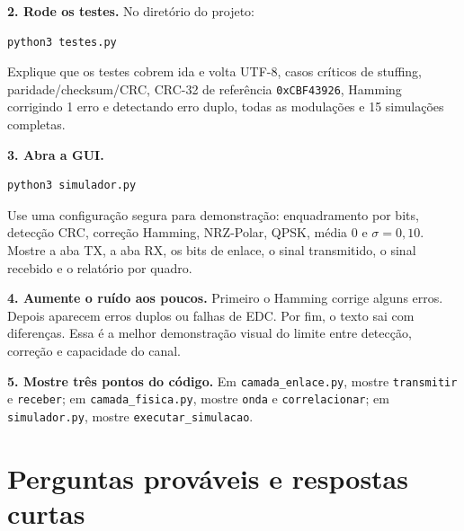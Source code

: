 \documentclass[10pt,a4paper]{article}
\newcommand{\arquivo}[1]{\texttt{#1}}
\newcommand{\codigo}[1]{\texttt{#1}}
\begin{document}
\textbf{2. Rode os testes.} No diretório do projeto:
\begin{verbatim}
python3 testes.py
\end{verbatim}
Explique que os testes cobrem ida e volta UTF-8, casos críticos de stuffing, paridade/checksum/CRC, CRC-32 de referência \codigo{0xCBF43926}, Hamming corrigindo 1 erro e detectando erro duplo, todas as modulações e 15 simulações completas.

\textbf{3. Abra a GUI.}
\begin{verbatim}
python3 simulador.py
\end{verbatim}
Use uma configuração segura para demonstração: enquadramento por bits, detecção CRC, correção Hamming, NRZ-Polar, QPSK, média 0 e \(\sigma=0{,}10\). Mostre a aba TX, a aba RX, os bits de enlace, o sinal transmitido, o sinal recebido e o relatório por quadro.

\textbf{4. Aumente o ruído aos poucos.} Primeiro o Hamming corrige alguns erros. Depois aparecem erros duplos ou falhas de EDC. Por fim, o texto sai com diferenças. Essa é a melhor demonstração visual do limite entre detecção, correção e capacidade do canal.

\textbf{5. Mostre três pontos do código.} Em \arquivo{camada\_enlace.py}, mostre \codigo{transmitir} e \codigo{receber}; em \arquivo{camada\_fisica.py}, mostre \codigo{onda} e \codigo{correlacionar}; em \arquivo{simulador.py}, mostre \codigo{executar\_simulacao}.

\section{Perguntas prováveis e respostas curtas}
\end{document}
